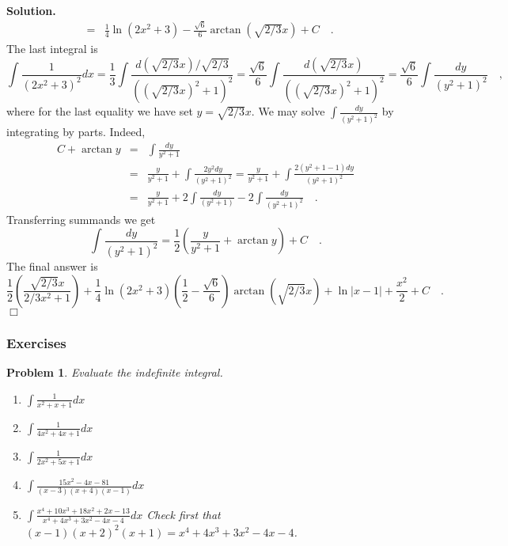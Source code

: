 \documentclass[12pt]{book}
\newenvironment{solution}{\textbf{Solution.} }{$\Box$}
\newtheorem{problem}{Problem}[section]
\begin{document}
\begin{solution}
\[\begin{array}{rcl}
&=&\frac{1}{4}\ln (2x^2+3)-\frac{\sqrt{6}}{6}\arctan (\sqrt{2/3}x)+C
\quad .
\end{array}
\]
The last integral is
\[
\int \frac{1}{(2x^2+3)^2}dx= \frac{1}3 \int \frac{d(\sqrt{2/3}x)/\sqrt{2/3}}{((\sqrt{2/3}x)^2+1)^2}= \frac{\sqrt{6}}{6}\int \frac{d(\sqrt{2/3}x)}{((\sqrt{2/3}x)^2+1)^2}= \frac{\sqrt{6}}{6}\int \frac{dy}{(y^2+1)^2}\quad,
\]
where for the last equality we have set $y=\sqrt{2/3}x$. We may solve $\int\frac{dy}{(y^2+1)^2}$ by integrating by parts. Indeed,
\[\begin{array}{rcl}
C+\arctan y &=& \int \frac{dy}{y^2+1}\\
&=& \frac{y}{y^2+1} +\int \frac{2y^2dy}{(y^2+1)^2}= \frac{y}{y^2+1}+\int \frac{2(y^2+1-1)dy}{(y^2+1)^2}\\
&=&\frac{y}{y^2+1} + 2\int \frac{dy}{(y^2+1)}- 2\int \frac{dy}{(y^2+1)^2}\quad.
\end{array}
\]
Transferring summands we get 
\[
\int \frac{dy}{(y^2+1)^2}= \frac{1}{2}\left(\frac{y}{y^2+1}+\arctan y\right) +C\quad .
\]
The final answer is 
\[
\frac{1}{2}\left(\frac{\sqrt{2/3}x}{2/3x^2+1}\right) +\frac{1}{4}\ln (2x^2+3)\left(\frac{1}2-\frac{\sqrt{6}}{6}\right)\arctan (\sqrt{2/3}x)+\ln|x-1|+\frac{x ^2}2+C\quad .
\]
\end{solution}
\subsubsection{Exercises}
\begin{problem}
Evaluate the indefinite integral. 
\begin{enumerate}
\item $\int \frac1{x^2+x+1}dx$
\item $\int \frac1{4x^2+4x+1}dx$
\item $\int \frac1{2x^2+5x+1}dx$
\item $\int \frac{15x^2-4x-81}{(x-3)(x+4)(x-1)}dx$
\item $\int \frac {x^{4}+10x^{3}+18x^{2}+2x-13}{x^{4}+4x^{3}+3x^{2}-4x-4}dx$ 
Check first that $(x-1)(x+2)^2(x+1)= x^{4}+4x^{3}+3x^{2}-4x-4$.
\end{enumerate}
\end{problem}
\end{document}
